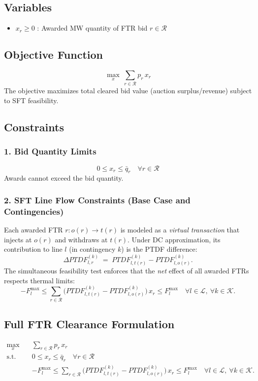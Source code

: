 \documentclass[11pt]{article}
\begin{document}
\subsection*{Variables}
\begin{itemize}
  \item $x_r \ge 0$ : Awarded MW quantity of FTR bid $r\in\mathcal{R}$
\end{itemize}

\subsection*{Objective Function}
\begin{equation}
\max_{x}\ \sum_{r\in\mathcal{R}} p_r\,x_r
\tag{1}
\end{equation}
The objective maximizes total cleared bid value (auction surplus/revenue) subject to SFT feasibility.

\subsection*{Constraints}

\subsubsection*{1. Bid Quantity Limits}
\begin{equation}
0 \le x_r \le \bar q_r \quad \forall r\in\mathcal{R}
\tag{2}
\end{equation}
Awards cannot exceed the bid quantity.

\subsubsection*{2. SFT Line Flow Constraints (Base Case and Contingencies)}
Each awarded FTR $r: o(r)\to t(r)$ is modeled as a \emph{virtual transaction} that injects at $o(r)$ and
withdraws at $t(r)$. Under DC approximation, its contribution to line $l$ (in contingency $k$) is the PTDF
difference:
\[
\Delta PTDF^{(k)}_{l,r} \;=\; PTDF^{(k)}_{l,t(r)} - PTDF^{(k)}_{l,o(r)}.
\]
The simultaneous feasibility test enforces that the \emph{net} effect of all awarded FTRs respects thermal limits:
\begin{equation}
- F_l^{\max}
\le
\sum_{r\in\mathcal{R}} \Big( PTDF^{(k)}_{l,t(r)} - PTDF^{(k)}_{l,o(r)} \Big)\,x_r
\le
F_l^{\max}
\quad \forall l\in\mathcal{L},\ \forall k\in\mathcal{K}.
\tag{3}
\end{equation}

\subsection*{Full FTR Clearance Formulation}
\begin{align}
\max_{x}\quad & \sum_{r\in\mathcal{R}} p_r\,x_r
\tag{4}\\[4pt]
\text{s.t.}\quad
& 0 \le x_r \le \bar q_r \quad \forall r\in\mathcal{R}
\tag{5}\\[4pt]
& - F_l^{\max}
\le
\sum_{r\in\mathcal{R}} \Big( PTDF^{(k)}_{l,t(r)} - PTDF^{(k)}_{l,o(r)} \Big)\,x_r
\le
F_l^{\max}
\quad \forall l\in\mathcal{L},\ \forall k\in\mathcal{K}.
\tag{6}
\end{align}
\end{document}
